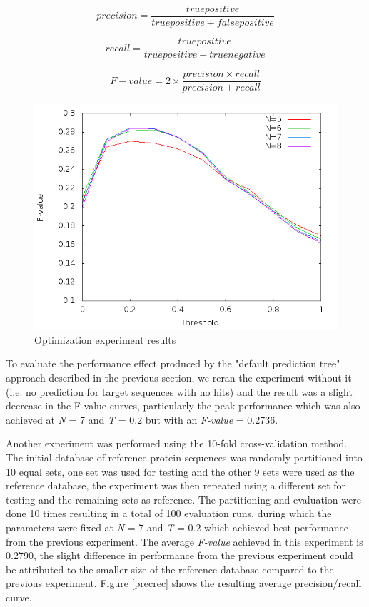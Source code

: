 \documentclass{bioinfo}
\begin{document}
\begin{equation}
precision = \frac{true positive}{true positive + false positive}
\label{eq:02}
\end{equation}

\begin{equation}
recall = \frac{true positive}{true positive + true negative}
\label{eq:03}
\end{equation}

\begin{equation}
F-value = 2\times\frac{precision \times recall}{precision + recall}
\label{eq:04}
\end{equation}

\begin{figure}[!tpb]
\centerline{\includegraphics[scale=0.4]{bilder/optim.png}}
\caption{Optimization experiment results}
\label{optim}
\end{figure}

To evaluate the performance effect produced by the "default prediction tree" approach described in the previous section, we reran the experiment without it (i.e. no prediction for target sequences with no hits) and the result was a slight decrease in the F-value curves, particularly the peak performance which was also achieved at \textit{N} = 7 and \textit{T} = 0.2 but with an \textit{F-value} = 0.2736.

Another experiment was performed using the 10-fold cross-validation method. The initial database of reference protein sequences was randomly partitioned into 10 equal sets, one set was used for testing and the other 9 sets were used as the reference database, the experiment was then repeated using a different set for testing and the remaining sets as reference. The partitioning and evaluation were done 10 times resulting in a total of 100 evaluation runs, during which the parameters were fixed at \textit{N} = 7 and \textit{T} = 0.2 which achieved best performance from the previous experiment. The average \textit{F-value} achieved in this experiment is 0.2790, the slight difference in performance from the previous experiment could be attributed to the smaller size of the reference database compared to the previous experiment. Figure \ref{precrec} shows the resulting average precision/recall curve.
\end{document}
